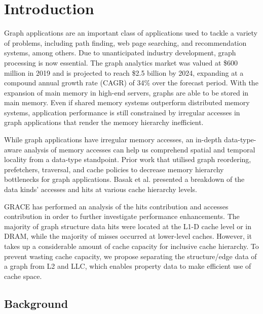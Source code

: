\documentclass[a4paper,12pt, final]{report}
\begin{document}
\tableofcontents
  \listoffigures

\chapter{Introduction}
Graph applications are an important class of applications used to tackle a variety of problems, including path finding, web page searching, and recommendation systems, among others. Due to unanticipated industry development, graph processing is now essential. The graph analytics market was valued at \$600 million in 2019 and is projected to reach \$2.5 billion by 2024, expanding at a compound annual growth rate (CAGR) of 34\% over the forecast period\cite{graphMarket}. With the expansion of main memory in high-end servers, graphs are able to be stored in main memory. Even if shared memory systems outperform distributed memory systems, application performance is still constrained by irregular accesses in graph applications that render the memory hierarchy inefficient.

While graph applications have irregular memory accesses, an in-depth data-type-aware analysis of memory accesses can help us comprehend spatial and temporal locality from a data-type standpoint. Prior work that utilised graph reordering\cite{cite3}, prefetchers\cite{Basak2019AnalysisAO}\cite{cite5}, traversal\cite{cite6}, and cache policies\cite{cite7}\cite{poptcite8} to decrease memory hierarchy bottlenecks for graph applications. Basak et al.\cite{Basak2019AnalysisAO} presented a breakdown of the data kinds' accesses and hits at various cache hierarchy levels.

GRACE\cite{grace} has performed an analysis of the hits contribution and accesses contribution in order to further investigate performance enhancements. The majority of graph structure data hits were located at the L1-D cache level or in DRAM, while the majority of misses occurred at lower-level caches. However, it takes up a considerable amount of cache capacity for inclusive cache hierarchy. To prevent wasting cache capacity, we propose separating the structure/edge data of a graph from L2 and LLC, which enables property data to make efficient use of cache space.

\section{Background}
\end{document}
